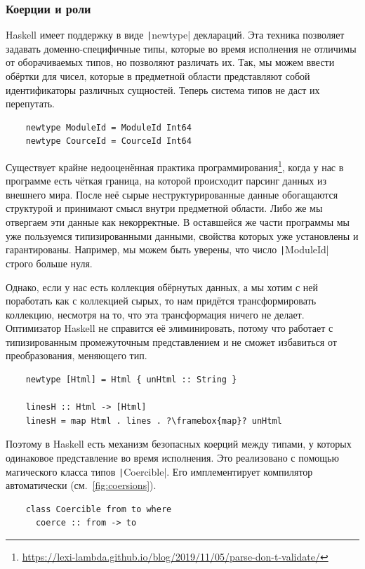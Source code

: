 \subsubsection{Коерции и роли} \label{subsubsec:coercions}

Haskell имеет поддержку  в виде \texttt|newtype| деклараций.
Эта техника позволяет задавать доменно-специфичные типы, которые во время исполнения не отличимы от оборачиваемых типов, но позволяют различать их.
Так, мы можем ввести обёртки для чисел, которые в предметной области представляют собой идентификаторы различных сущностей.
Теперь система типов не даст их перепутать.
\begin{verbatim}
    newtype ModuleId = ModuleId Int64
    newtype CourceId = CourceId Int64
\end{verbatim}

Существует крайне недооценённая практика программирования\footnote{\url{https://lexi-lambda.github.io/blog/2019/11/05/parse-don-t-validate/}}, когда у нас в программе есть чёткая граница, на которой происходит парсинг данных из внешнего мира.
После неё сырые неструктурированные данные обогащаются структурой и принимают смысл внутри предметной области.
Либо же мы отвергаем эти данные как некорректные.
В оставшейся же части программы мы уже пользуемся типизированными данными, свойства которых уже установлены и гарантированы.
Например, мы можем быть уверены, что число \texttt|ModuleId| строго больше нуля.

Однако, если у нас есть коллекция обёрнутых данных, а мы хотим с ней поработать как с коллекцией сырых, то нам придётся трансформировать коллекцию, несмотря на то, что эта трансформация ничего не делает.
Оптимизатор Haskell не справится её элиминировать, потому что работает с типизированным промежуточным представлением и не сможет избавиться от преобразования, меняющего тип.
\begin{verbatim}
    newtype [Html] = Html { unHtml :: String }

    linesH :: Html -> [Html]
    linesH = map Html . lines . ?\framebox{map}? unHtml
\end{verbatim}

Поэтому в Haskell есть механизм безопасных коерций между типами, у которых одинаковое представление во время исполнения.
Это реализовано с помощью магического класса типов \texttt|Coercible|.
Его имплементирует компилятор автоматически (см.~\ref{fig:coersions}).
\begin{verbatim}
    class Coercible from to where
      coerce :: from -> to
\end{verbatim}

